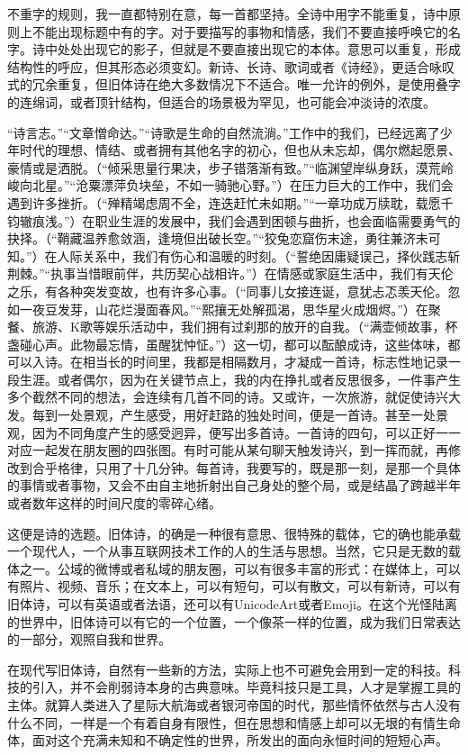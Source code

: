 \documentclass{article}
\begin{document}
不重字的规则，我一直都特别在意，每一首都坚持。全诗中用字不能重复，诗中原则上不能出现标题中有的字。对于要描写的事物和情感，我们不要直接呼唤它的名字。诗中处处出现它的影子，但就是不要直接出现它的本体。意思可以重复，形成结构性的呼应，但其形态必须变幻。新诗、长诗、歌词或者《诗经》，更适合咏叹式的冗余重复，但旧体诗在绝大多数情况下不适合。唯一允许的例外，是使用叠字的连绵词，或者顶针结构，但适合的场景极为罕见，也可能会冲淡诗的浓度。

“诗言志。”“文章憎命达。”“诗歌是生命的自然流淌。”工作中的我们，已经远离了少年时代的理想、情结、或者拥有其他名字的初心，但也从未忘却，偶尔燃起愿景、豪情或是洒脱。（“倾采思量行果决，步子错落渐有致。”“临渊望岸纵身跃，漠荒岭峻向北星。”“沧粟漂萍负块垒，不如一骑驰心野。”）在压力巨大的工作中，我们会遇到许多挫折。（“殚精竭虑周不全，连迭赶忙未如期。”“一章功成万牍耽，载愿千钧辙痕浅。”）在职业生涯的发展中，我们会遇到困顿与曲折，也会面临需要勇气的抉择。（“鞘藏温养愈敛涵，逢境但出破长空。”“狡兔恋窟伤末途，勇往兼济未可知。”）在人际关系中，我们有伤心和温暖的时刻。（“誓绝因庸疑误己，择伙践志斩荆棘。”“执事当惜眼前伴，共历契心战相许。”）在情感或家庭生活中，我们有天伦之乐，有各种突发变故，也有许多心事。（“同事儿女接连诞，意犹忐忑羡天伦。忽如一夜豆发芽，山花烂漫面春风。”“熙攘无处解孤渴，思华星火成烟烬。”）在聚餐、旅游、K歌等娱乐活动中，我们拥有过刹那的放开的自我。（“满壶倾故事，杯盏碰心声。此物最忘情，虽醒犹忡怔。”）这一切，都可以酝酿成诗，这些体味，都可以入诗。在相当长的时间里，我都是相隔数月，才凝成一首诗，标志性地记录一段生涯。或者偶尔，因为在关键节点上，我的内在挣扎或者反思很多，一件事产生多个截然不同的想法，会连续有几首不同的诗。又或许，一次旅游，就促使诗兴大发。每到一处景观，产生感受，用好赶路的独处时间，便是一首诗。甚至一处景观，因为不同角度产生的感受迥异，便写出多首诗。一首诗的四句，可以正好一一对应一起发在朋友圈的四张图。有时可能从某句聊天触发诗兴，到一挥而就，再修改到合乎格律，只用了十几分钟。每首诗，我要写的，既是那一刻，是那一个具体的事情或者事物，又会不由自主地折射出自己身处的整个局，或是结晶了跨越半年或者数年这样的时间尺度的零碎心绪。

这便是诗的选题。旧体诗，的确是一种很有意思、很特殊的载体，它的确也能承载一个现代人，一个从事互联网技术工作的人的生活与思想。当然，它只是无数的载体之一。公域的微博或者私域的朋友圈，可以有很多丰富的形式：在媒体上，可以有照片、视频、音乐；在文本上，可以有短句，可以有散文，可以有新诗，可以有旧体诗，可以有英语或者法语，还可以有UnicodeArt或者Emoji。在这个光怪陆离的世界中，旧体诗可以有它的一个位置，一个像茶一样的位置，成为我们日常表达的一部分，观照自我和世界。

在现代写旧体诗，自然有一些新的方法，实际上也不可避免会用到一定的科技。科技的引入，并不会削弱诗本身的古典意味。毕竟科技只是工具，人才是掌握工具的主体。就算人类进入了星际大航海或者银河帝国的时代，那些情怀依然与古人没有什么不同，一样是一个有着自身有限性，但在思想和情感上却可以无垠的有情生命体，面对这个充满未知和不确定性的世界，所发出的面向永恒时间的短短心声。
\end{document}
